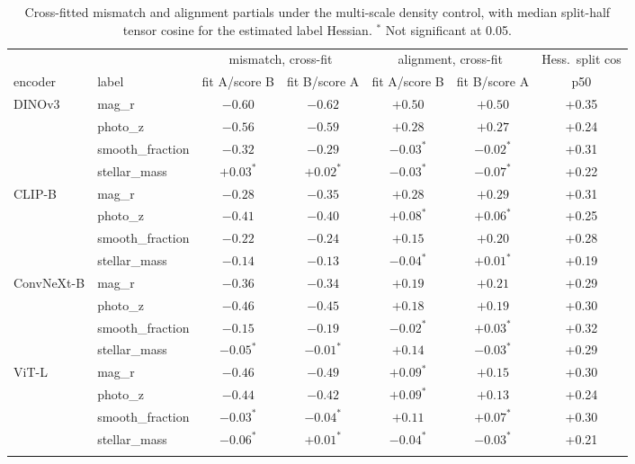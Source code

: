 \documentclass{article}
\begin{document}
\begin{table}[h]
\centering
\footnotesize
\setlength{\tabcolsep}{3.5pt}
\begin{tabular}{llccccc}
\toprule
 & & \multicolumn{2}{c}{mismatch, cross-fit}
 & \multicolumn{2}{c}{alignment, cross-fit}
 & Hess.\ split cos \\
encoder & label & fit A/score B & fit B/score A
& fit A/score B & fit B/score A & p50 \\
\midrule
\addlinespace[2pt]
DINOv3 & mag\_r & $-0.60$ & $-0.62$ & $+0.50$ & $+0.50$ & +0.35 \\
 & photo\_z & $-0.56$ & $-0.59$ & $+0.28$ & $+0.27$ & +0.24 \\
 & smooth\_fraction & $-0.32$ & $-0.29$ & $-0.03^{*}$ & $-0.02^{*}$ & +0.31 \\
 & stellar\_mass & $+0.03^{*}$ & $+0.02^{*}$ & $-0.03^{*}$ & $-0.07^{*}$ & +0.22 \\
\addlinespace[2pt]
CLIP-B & mag\_r & $-0.28$ & $-0.35$ & $+0.28$ & $+0.29$ & +0.31 \\
 & photo\_z & $-0.41$ & $-0.40$ & $+0.08^{*}$ & $+0.06^{*}$ & +0.25 \\
 & smooth\_fraction & $-0.22$ & $-0.24$ & $+0.15$ & $+0.20$ & +0.28 \\
 & stellar\_mass & $-0.14$ & $-0.13$ & $-0.04^{*}$ & $+0.01^{*}$ & +0.19 \\
\addlinespace[2pt]
ConvNeXt-B & mag\_r & $-0.36$ & $-0.34$ & $+0.19$ & $+0.21$ & +0.29 \\
 & photo\_z & $-0.46$ & $-0.45$ & $+0.18$ & $+0.19$ & +0.30 \\
 & smooth\_fraction & $-0.15$ & $-0.19$ & $-0.02^{*}$ & $+0.03^{*}$ & +0.32 \\
 & stellar\_mass & $-0.05^{*}$ & $-0.01^{*}$ & $+0.14$ & $-0.03^{*}$ & +0.29 \\
\addlinespace[2pt]
ViT-L & mag\_r & $-0.46$ & $-0.49$ & $+0.09^{*}$ & $+0.15$ & +0.30 \\
 & photo\_z & $-0.44$ & $-0.42$ & $+0.09^{*}$ & $+0.13$ & +0.24 \\
 & smooth\_fraction & $-0.03^{*}$ & $-0.04^{*}$ & $+0.11$ & $+0.07^{*}$ & +0.30 \\
 & stellar\_mass & $-0.06^{*}$ & $+0.01^{*}$ & $-0.04^{*}$ & $-0.03^{*}$ & +0.21 \\
\addlinespace[2pt]
\bottomrule
\end{tabular}
\caption{Cross-fitted mismatch and alignment
partials under the multi-scale density
control, with median split-half tensor
cosine for the estimated label Hessian.
$^{*}$ Not significant at 0.05.}
\label{tab:xencx}
\end{table}
\end{document}
